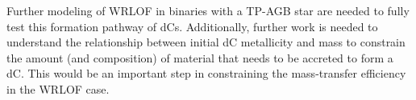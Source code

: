 \documentclass[twocolumn]{aastex631}
\begin{document}
Further modeling of WRLOF in binaries with a TP-AGB star are needed to fully test this formation pathway of dCs. Additionally, further work is needed to understand the relationship between initial dC metallicity and mass to constrain the amount (and composition) of material that needs to be accreted to form a dC. This would be an important step in constraining the mass-transfer efficiency in the WRLOF case. 






\end{document}
